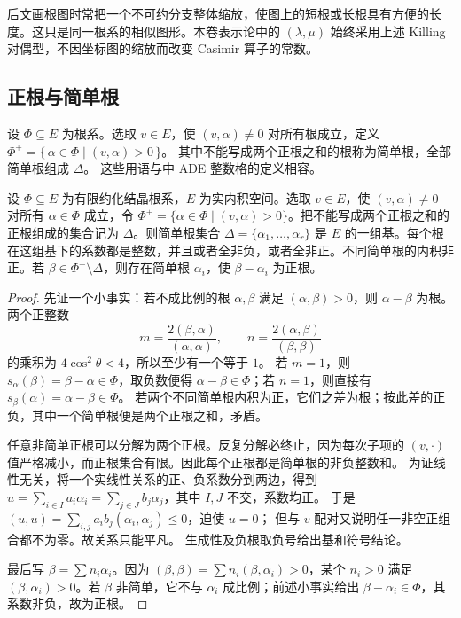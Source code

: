 后文画根图时常把一个不可约分支整体缩放，使图上的短根或长根具有方便的长度。这只是同一根系的相似图形。本卷表示论中的 \((\lambda,\mu)\) 始终采用上述 Killing 对偶型，不因坐标图的缩放而改变 Casimir 算子的常数。

\subsection{正根与简单根}
\label{b5:subsec:1604:02}

设 \(\Phi\subseteq E\) 为根系。选取 \(v\in E\)，使 \((v,\alpha)\ne0\) 对所有根成立，定义 \(\Phi^+=\bigl\{\,\alpha\in\Phi\mid(v,\alpha)>0\,\bigr\}\)。 其中不能写成两个正根之和的根称为简单根，全部简单根组成 \(\Delta\)。 这些用语与中 ADE 整数格的定义相容。

\begin{theorem}[简单根基]\label{b5:thm:simple-roots}
	设 \(\Phi\subseteq E\) 为有限约化结晶根系，\(E\) 为实内积空间。选取 \(v\in E\)，使 \((v,\alpha)\ne0\) 对所有 \(\alpha\in\Phi\) 成立，令 \(\Phi^+=\{\alpha\in\Phi\mid(v,\alpha)>0\}\)。把不能写成两个正根之和的正根组成的集合记为 \(\Delta\)。则简单根集合 \(\Delta=\{\alpha_1,\ldots,\alpha_r\}\) 是 \(E\) 的一组基。每个根在这组基下的系数都是整数，并且或者全非负，或者全非正。不同简单根的内积非正。若 \(\beta\in\Phi^+\setminus\Delta\)，则存在简单根 \(\alpha_i\)，使 \(\beta-\alpha_i\) 为正根。
\end{theorem}
\begin{proof}
	先证一个小事实：若不成比例的根 \(\alpha,\beta\) 满足 \((\alpha,\beta)>0\)，则 \(\alpha-\beta\) 为根。两个正整数
	\[
		m=\frac{2(\beta,\alpha)}{(\alpha,\alpha)},\qquad n=\frac{2(\alpha,\beta)}{(\beta,\beta)}
	\]
	的乘积为 \(4\cos^2\theta<4\)，所以至少有一个等于 \(1\)。 若 \(m=1\)，则 \(s_\alpha(\beta)=\beta-\alpha\in\Phi\)，取负数便得 \(\alpha-\beta\in\Phi\)；若 \(n=1\)，则直接有 \(s_\beta(\alpha)=\alpha-\beta\in\Phi\)。 若两个不同简单根内积为正，它们之差为根；按此差的正负，其中一个简单根便是两个正根之和，矛盾。

	任意非简单正根可以分解为两个正根。反复分解必终止，因为每次子项的 \((v,\cdot)\) 值严格减小，而正根集合有限。因此每个正根都是简单根的非负整数和。 为证线性无关，将一个实线性关系的正、负系数分到两边，得到 \(u=\sum_{i\in I}a_i\alpha_i=\sum_{j\in J}b_j\alpha_j\)，其中 \(I,J\) 不交，系数均正。 于是 \((u,u)=\sum_{i,j}a_i b_j(\alpha_i,\alpha_j)\leq0\)，迫使 \(u=0\)； 但与 \(v\) 配对又说明任一非空正组合都不为零。故关系只能平凡。 生成性及负根取负号给出基和符号结论。

	最后写 \(\beta=\sum n_i\alpha_i\)。因为 \((\beta,\beta)=\sum n_i(\beta,\alpha_i)>0\)，某个 \(n_i>0\) 满足 \((\beta,\alpha_i)>0\)。若 \(\beta\) 非简单，它不与 \(\alpha_i\) 成比例；前述小事实给出 \(\beta-\alpha_i\in\Phi\)，其系数非负，故为正根。
\end{proof}

